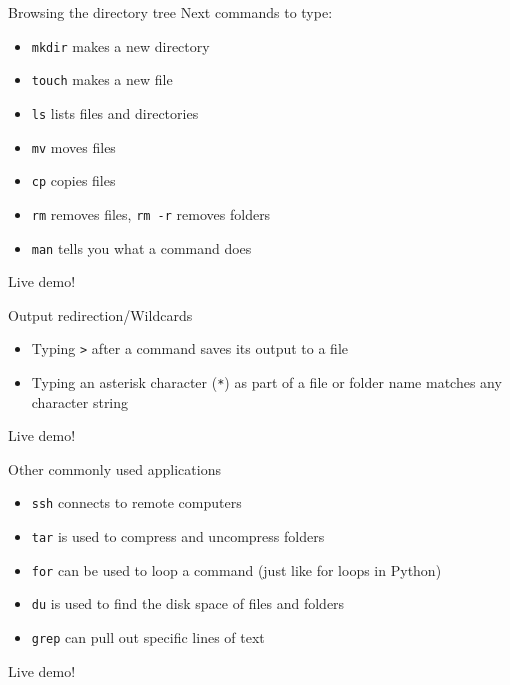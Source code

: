 \begin{frame}{Browsing the directory tree}
  Next commands to type:
  \begin{itemize}
  \item \texttt{mkdir} makes a new directory
  \item \texttt{touch} makes a new file
  \item \texttt{ls} lists files and directories
  \item \texttt{mv} moves files
  \item \texttt{cp} copies files
  \item \texttt{rm} removes files, \texttt{rm -r} removes folders
  \item \texttt{man} tells you what a command does
  \end{itemize}
  Live demo!
\end{frame}

\begin{frame}{Output redirection/Wildcards}
  \begin{itemize}
  \item Typing \texttt{>} after a command saves its output to a file
  \item Typing an asterisk character (\texttt{*}) as part of a
    file or folder name matches any character string
  \end{itemize}
  Live demo!
\end{frame}

\begin{frame}{Other commonly used applications}
  \begin{itemize}
  \item \texttt{ssh} connects to remote computers
  \item \texttt{tar} is used to compress and uncompress folders
  \item \texttt{for} can be used to loop a command
    (just like for loops in Python)
  \item \texttt{du} is used to find the disk space of files and folders
  \item \texttt{grep} can pull out specific lines of text
  \end{itemize}
  Live demo!
\end{frame}

